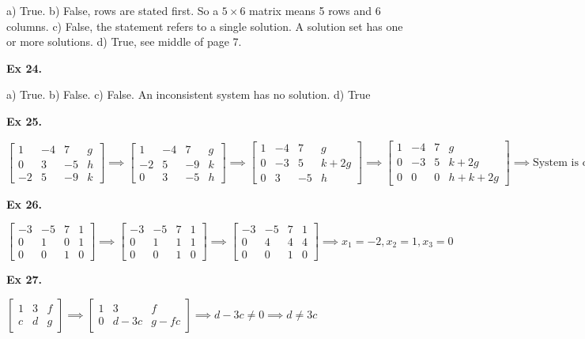 \documentclass{article}
\begin{document}
a) True. b) False, rows are stated first. So a $5 \times 6$ matrix means 5 rows and 6 columns. c) False, the statement refers to a single solution. A solution set has one or more solutions. d) True, see middle of page 7.

\textbf{Ex 24.}

a) True. b) False. c) False. An inconsistent system has no solution. d) True

\textbf{Ex 25.}

$
\begin{bmatrix}
1 &-4 &7 &g\\
0 &3 &-5 &h\\
-2 &5 &-9 &k
\end{bmatrix}
\implies
\begin{bmatrix}
1 &-4 &7 &g\\
-2 &5 &-9 &k\\
0 &3 &-5 &h
\end{bmatrix}
\implies
\begin{bmatrix}
1 &-4 &7 &g\\
0 &-3 &5 &k+2g\\
0 &3 &-5 &h
\end{bmatrix}
\implies
\begin{bmatrix}
1 &-4 &7 &g\\
0 &-3 &5 &k+2g\\
0 &0 &0 &h+k+2g
\end{bmatrix}
\implies \text{System is consisten when $h+k+2g = 0$}
$

\textbf{Ex 26.}

$
\begin{bmatrix}
-3 &-5 &7 &1\\
0 &1 &0 &1\\
0 &0 &1 &0
\end{bmatrix}
\implies
\begin{bmatrix}
-3 &-5 &7 &1\\
0 &1 &1 &1\\
0 &0 &1 &0
\end{bmatrix}
\implies
\begin{bmatrix}
-3 &-5 &7 &1\\
0 &4 &4 &4\\
0 &0 &1 &0
\end{bmatrix}
\implies x_1=-2, x_2=1, x_3=0
$

\textbf{Ex 27.}

$
\begin{bmatrix}
1 &3 &f\\
c &d &g
\end{bmatrix}
\implies
\begin{bmatrix}
1 &3 &f\\
0 &d-3c &g-fc
\end{bmatrix}
\implies d - 3c \neq 0
\implies d \neq 3c
$
\end{document}
